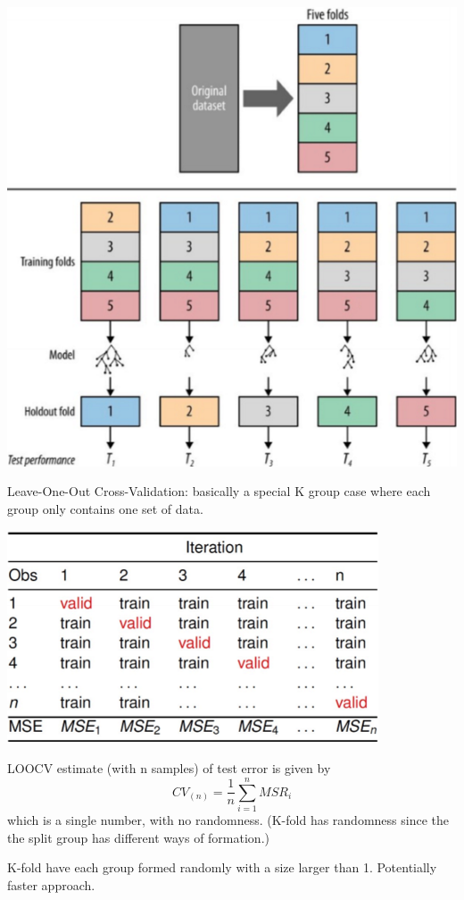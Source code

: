 \documentclass[letterpaper,12pt]{article}
\begin{document}
\includegraphics{./Image/K group cross validation.png}

Leave-One-Out Cross-Validation: basically a special K group case where each
group only contains one set of data.

\includegraphics{./Image/Leave-Out-Out Cross_Validation.png}

LOOCV estimate (with n samples) of test error is given by
\[
    CV_{(n)}=\frac{1}{n} \sum_{i=1}^{n}MSR_i
\]
which is a single number, with no randomness. (K-fold has randomness since the
the split group has different ways of formation.)

K-fold have each group formed randomly with a size larger than 1. Potentially
faster approach.
\end{document}
